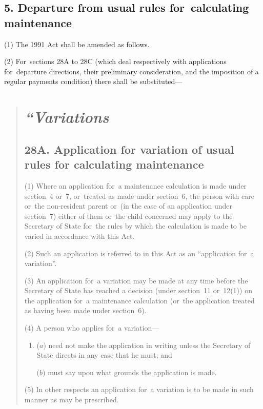 \documentclass[12pt,a4paper]{article}
\begin{document}
\subsection{5. Departure from usual rules for~calculating maintenance}

(1) The 1991 Act shall be amended as follows.

(2) For~sections 28A to 28C (which deal respectively with applications for~departure directions, their preliminary consideration, and the imposition of a regular payments condition) there shall be substituted—

\begin{quotation}
\section*{\itshape “Variations}

\subsection*{28A. Application for variation of usual rules for calculating maintenance}

(1) Where an application for~a maintenance calculation is made under section~4 or~7, or~treated as made under section~6, the person with care or~the non-resident parent or~(in the case of an application under section~7) either of them or~the child concerned may apply to the Secretary of State for~the rules by which the calculation is made to be varied in accordance with this Act.

(2) Such an application is referred to in this Act as an “application for~a variation”.

(3) An application for~a variation may be made at any time before the Secretary of State has reached a decision (under section~11 or~12(1)) on the application for~a maintenance calculation (or~the application treated as having been made under section~6).

(4) A person who applies for~a variation—
\begin{enumerate}\item[]
($a$) need not make the application in writing unless the Secretary of State directs in any case that he must; and

($b$) must say upon what grounds the application is made.
\end{enumerate}

(5) In other respects an application for~a variation is to be made in such manner as may be prescribed.


\end{quotation}
\end{document}
